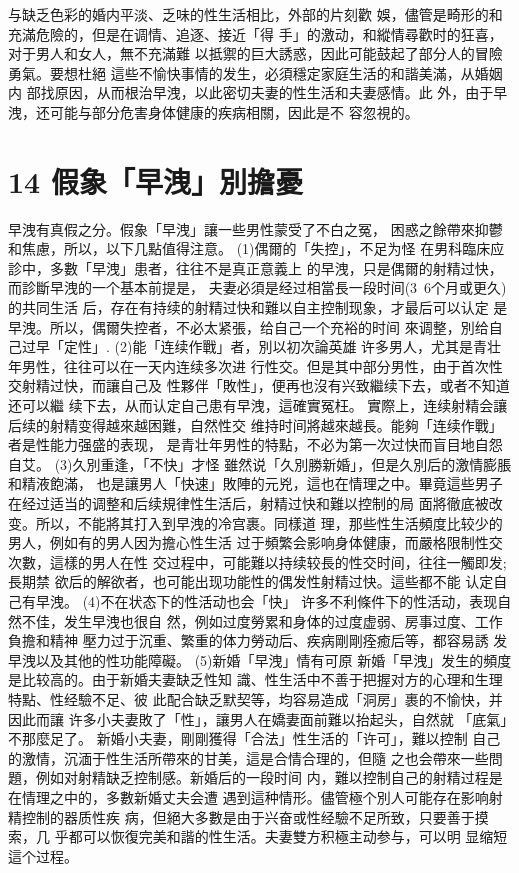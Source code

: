 \documentclass[12pt,UTF8]{ctexbook}
\begin{document}
与缺乏色彩的婚内平淡、乏味的性生活相比，外部的片刻歡
娛，儘管是畸形的和充滿危險的，但是在调情、追逐、接近「得
手」的激动，和縱情尋歡时的狂喜，对于男人和女人，無不充滿難
以抵禦的巨大誘惑，因此可能鼓起了部分人的冒險勇氣。要想杜絕
這些不愉快事情的发生，必須穩定家庭生活的和諧美滿，从婚姻内
部找原因，从而根治早洩，以此密切夫妻的性生活和夫妻感情。此
外，由于早洩，还可能与部分危害身体健康的疾病相關，因此是不
容忽視的。

\section{14 假象「早洩」別擔憂}

早洩有真假之分。假象「早洩」讓一些男性蒙受了不白之冤，
困惑之餘帶來抑鬱和焦慮，所以，以下几點值得注意。
(1)偶爾的「失控」，不足为怪
在男科臨床应診中，多數「早洩」患者，往往不是真正意義上
的早洩，只是偶爾的射精过快，而診斷早洩的一个基本前提是，
夫妻必須是经过相當長一段时间(3~6个月或更久)的共同生活
后，存在有持续的射精过快和難以自主控制现象，才最后可以认定
是早洩。所以，偶爾失控者，不必太紧張，给自己一个充裕的时间
來调整，別给自己过早「定性」.
(2)能「连续作戰」者，別以初次論英雄
许多男人，尤其是青壮年男性，往往可以在一天内连续多次进
行性交。但是其中部分男性，由于首次性交射精过快，而讓自己及
性夥伴「敗性」，便再也沒有兴致繼续下去，或者不知道还可以繼
续下去，从而认定自己患有早洩，這確實冤枉。
實際上，连续射精会讓后续的射精变得越來越困難，自然性交
维持时间將越來越長。能夠「连续作戰」者是性能力强盛的表现，
是青壮年男性的特點，不必为第一次过快而盲目地自怨自艾。
(3)久別重逢，「不快」才怪
雖然说「久別勝新婚」，但是久別后的激情膨脹和精液飽滿，
也是讓男人「快速」敗陣的元兇，這也在情理之中。畢竟這些男子
在经过适当的调整和后续規律性生活后，射精过快和難以控制的局
面將徹底被改变。所以，不能將其打入到早洩的冷宫裹。同樣道
理，那些性生活頻度比较少的男人，例如有的男人因为擔心性生活
过于頻繁会影响身体健康，而嚴格限制性交次數，這樣的男人在性
交过程中，可能難以持续较長的性交时间，往往一觸即发;長期禁
欲后的解欲者，也可能出现功能性的偶发性射精过快。這些都不能
认定自己有早洩。
(4)不在状态下的性活动也会「快」
许多不利條件下的性活动，表现自然不佳，发生早洩也很自
然，例如过度勞累和身体的过度虚弱、房事过度、工作負擔和精神
壓力过于沉重、繁重的体力勞动后、疾病剛剛痊癒后等，都容易誘
发早洩以及其他的性功能障礙。
(5)新婚「早洩」情有可原
新婚「早洩」发生的頻度是比较高的。由于新婚夫妻缺乏性知
識、性生活中不善于把握对方的心理和生理特點、性经驗不足、彼
此配合缺乏默契等，均容易造成「洞房」裹的不愉快，并因此而讓
许多小夫妻敗了「性」，讓男人在嬌妻面前難以抬起头，自然就
「底氣」不那麼足了。
新婚小夫妻，剛剛獲得「合法」性生活的「许可」，難以控制
自己的激情，沉湎于性生活所帶來的甘美，這是合情合理的，但隨
之也会帶來一些問題，例如对射精缺乏控制感。新婚后的一段时间
内，難以控制自己的射精过程是在情理之中的，多數新婚丈夫会遭
遇到這种情形。儘管極个別人可能存在影响射精控制的器质性疾
病，但絕大多數是由于兴奋或性经驗不足所致，只要善于摸索，几
乎都可以恢復完美和諧的性生活。夫妻雙方积極主动参与，可以明
显缩短這个过程。
\end{document}
